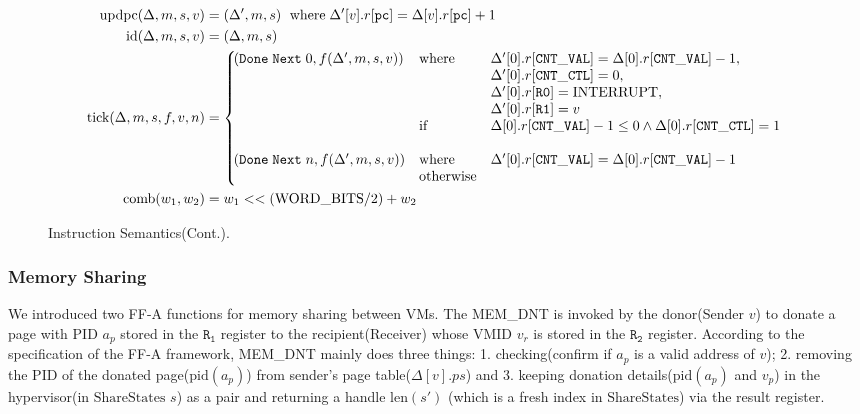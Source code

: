 \documentclass[a4paper]{article}
\newcommand*{\SSS}{\text{ShareStates}}
\newcommand*{\PID}{\text{PID}}
\newcommand*{\VMID}{\text{VMID}}
\newcommand*{\PWBITS}{\text{WORD\_BITS}}
\newcommand*{\updpc}{\text{updpc}}
\begin{document}
\begin{figure}[!h]
  \begin{align*}
    \updpc(\Delta,m,s,v)&=(\Delta',m,s)\ \; \text{where}\; \Delta'[v].r[\mathtt{pc}] = \Delta[v].r[\mathtt{pc}]+1\\
    \text{id}(\Delta,m,s,v)& = (\Delta,m,s)\\
    \nextt(\Delta,m,s,f,v,n)&= \left\{\!\!\!\!\begin{array}{lll}
                                \DNXT{0}{f(\Delta',m,s,v)} &\text{where } %
                                & \Delta'[0].r[\mathtt{CNT\_VAL}] = \Delta[0].r[\mathtt{CNT\_VAL}] -1,\\
                                & &\Delta'[0].r[\mathtt{CNT\_CTL}] = 0,\\
                                & &\Delta'[0].r[\mathtt{R0}]=\toword{INTERRUPT},\\
                                & &\Delta'[0].r[\mathtt{R1}] = v\\
                                & \text{if}%
                                &\Delta[0].r[\mathtt{CNT\_VAL}] -1 \le 0\land\Delta[0].r[\mathtt{CNT\_CTL}] = 1\\
                                \\
                                \DNXT{n}{f(\Delta',m,s,v)} &\text{where}%
                                &\Delta'[0].r[\mathtt{CNT\_VAL}] = \Delta[0].r[\mathtt{CNT\_VAL}] -1\\
                                & \text{otherwise}\\
                                              \end{array}  \right.\\
    \text{comb}(w_{1},w_{2})&=w_{1}<<(\PWBITS/2)+w_{2}
  \end{align*}
  \caption{Instruction Semantics(Cont.).}
\end{figure}
\subsubsection{Memory Sharing}
We introduced two FF-A functions for memory sharing between VMs. The MEM\_DNT is
invoked by the donor(Sender $v$) to donate a page with $\PID$ $a_{p}$ stored in
the $\mathtt{R_{1}}$ register to the recipient(Receiver) whose $\VMID$ $v_{r}$
is stored in the $\mathtt{R_{2}}$ register. According to the specification of
the FF-A framework, MEM\_DNT mainly does three things: 1. checking(confirm if
$a_{p}$ is a valid address of $v$); 2. removing the $\PID$ of the donated
page($\text{pid}(a_{p})$) from sender's page table($\Delta[v].ps$) and 3.
keeping donation details($\text{pid}(a_{p})$ and $v_{p}$) in the hypervisor(in
$\SSS$ $s$) as a pair and returning a handle $\text{len}(s')$ (which is a fresh index
in $\SSS$) via the result register.
\end{document}
